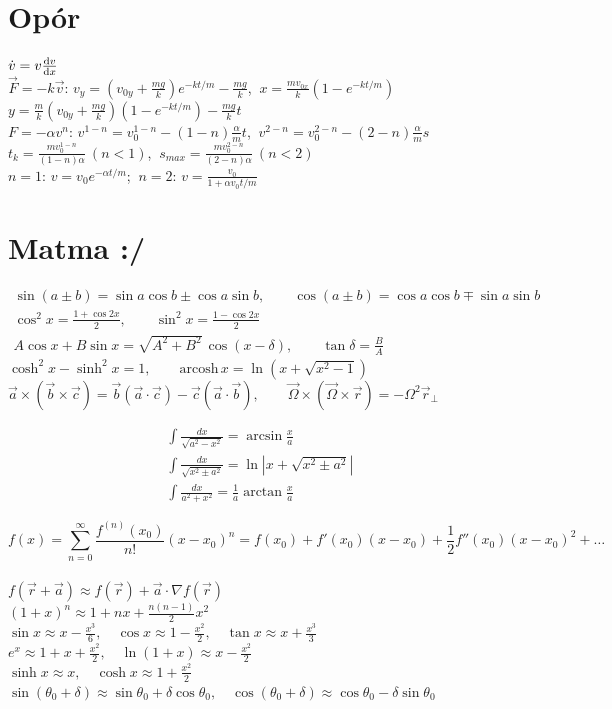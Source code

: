 \documentclass[10pt,a4paper,twocolumn]{article}
\begin{document}
\section{Opór}
$\dot v = v\frac{\text dv}{\text dx}$ \\
$\vec F = -k\vec v$: $v_y = \left(v_{0y}+\frac{mg}{k}\right)e^{-kt/m} - \frac{mg}{k}$, $\ x = \frac{m v_{0x}}{k}\left(1-e^{-kt/m}\right)$ \\
$y = \frac{m}{k}\left(v_{0y}+\frac{mg}{k}\right)\left(1-e^{-kt/m}\right) - \frac{mg}{k}t$ \\
$F = -\alpha v^n$: $v^{1-n} = v_0^{1-n} - (1-n)\frac{\alpha}{m}t$, $\ v^{2-n} = v_0^{2-n} - (2-n)\frac{\alpha}{m}s$ \\
$t_k = \frac{m v_0^{1-n}}{(1-n)\alpha}\ (n<1)$, $\ s_{max} = \frac{m v_0^{2-n}}{(2-n)\alpha}\ (n<2)$ \\
$n=1$: $v=v_0e^{-\alpha t/m}$; $\ n=2$: $v=\frac{v_0}{1+\alpha v_0 t/m}$

\section{Matma :/}
\[
\begin{gathered}
\sin(a\pm b) = \sin a\cos b \pm \cos a\sin b, \qquad \cos(a\pm b) = \cos a\cos b \mp \sin a\sin b \\
\cos^2x = \frac{1+\cos 2x}{2}, \qquad \sin^2x = \frac{1-\cos 2x}{2} \\
A\cos x + B\sin x = \sqrt{A^2+B^2}\,\cos(x-\delta), \qquad \tan\delta = \frac{B}{A}
\end{gathered}
\]
$\cosh^2x - \sinh^2x = 1, \qquad \mathrm{arcosh}\,x = \ln\left(x+\sqrt{x^2-1}\right)$ \\
$\vec a\times(\vec b\times\vec c) = \vec b(\vec a\cdot\vec c) - \vec c(\vec a\cdot\vec b), \qquad \vec\Omega\times(\vec\Omega\times\vec r) = -\Omega^2\vec r_\perp$

\[ 
\begin{gathered}    
\int\frac{dx}{\sqrt{a^2-x^2}} = \arcsin\frac{x}{a} \\ \int\frac{dx}{\sqrt{x^2\pm a^2}} = \ln\left|x+\sqrt{x^2\pm a^2}\right| \\ \int\frac{dx}{a^2+x^2} = \frac1a\arctan\frac{x}{a} \end{gathered}
\]

\[f(x) = \sum_{n=0}^{\infty} \frac{f^{(n)}(x_0)}{n!}(x-x_0)^n
     = f(x_0) + f'(x_0)(x-x_0) + \frac{1}{2}f''(x_0)(x-x_0)^2 + \dots\] \\
$f(\vec r + \vec a) \approx f(\vec r) + \vec a \cdot \nabla f(\vec r)$ \\
$(1+x)^n \approx 1 + nx + \frac{n(n-1)}{2}x^2$ \\
$\sin x \approx x - \frac{x^3}{6}, \quad \cos x \approx 1 - \frac{x^2}{2}, \quad \tan x \approx x + \frac{x^3}{3}$ \\
$e^x \approx 1 + x + \frac{x^2}{2}, \quad \ln(1+x) \approx x - \frac{x^2}{2}$ \\
$\sinh x \approx x, \quad \cosh x \approx 1 + \frac{x^2}{2}$ \\
$\sin(\theta_0+\delta) \approx \sin\theta_0 + \delta\cos\theta_0, \quad
 \cos(\theta_0+\delta) \approx \cos\theta_0 - \delta\sin\theta_0$
\end{document}
